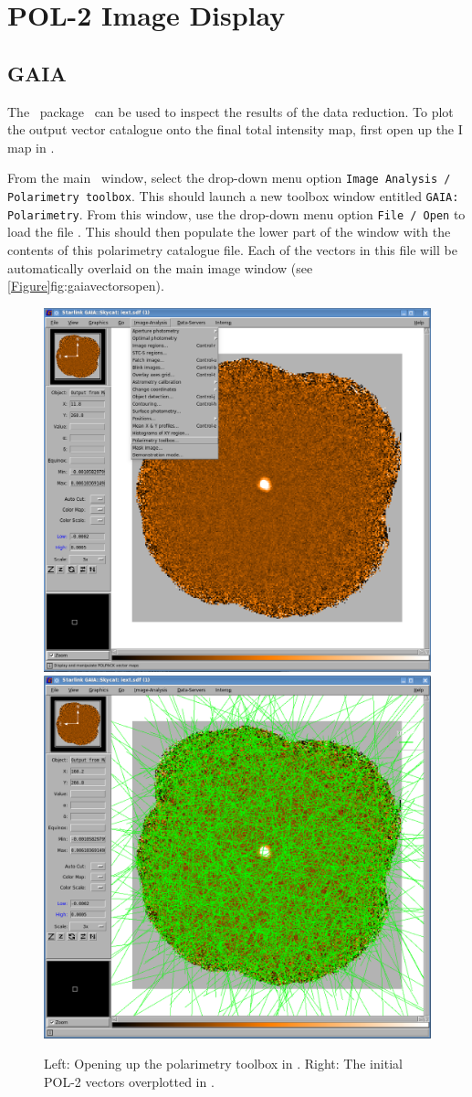 \chapter{POL-2 Image Display}
\label{sec:display}

\section{GAIA}

The \starlink\ package \gaia\ can be used to inspect the results of
the data reduction.  To plot the output vector catalogue onto the
final total intensity map, first open up the I map in \GAIA.

\begin{terminalv}
\end{terminalv}


From the main \GAIA\ window, select the drop-down menu option
\texttt{Image Analysis / Polarimetry toolbox}. This should launch a
new toolbox window entitled \texttt{GAIA: Polarimetry}. From this window, use
the drop-down menu option \texttt{File / Open} to load the file
. This should then populate the lower part of the window
with the contents of this polarimetry catalogue file.  Each of the vectors
in this file will be automatically overlaid on the main image window
(see \cref{Figure}{fig:gaiavectorsopen}{}).

\begin{figure}[ht!]
\begin{center}
\includegraphics[width=0.46\linewidth]{sc22-gaia-plot-vectors-1.png}
\includegraphics[width=0.46\linewidth]{sc22-gaia-plot-vectors-3.png}
\caption [Over Plotting Vectors in GAIA]{
  Left: Opening up the polarimetry toolbox in \GAIA. Right: The initial POL-2
  vectors overplotted in \GAIA.
\label{fig:gaiavectorsopen}
}
\end{center}
\end{figure}

